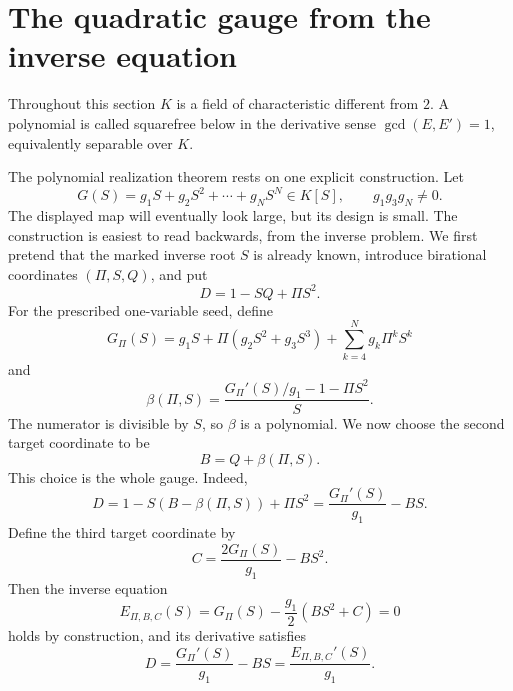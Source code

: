 \section{The quadratic gauge from the inverse equation}\label{sec:gauge}

Throughout this section \(K\) is a field of characteristic different from
\(2\).  A polynomial is called squarefree below in the derivative sense
\(\gcd(E,E')=1\), equivalently separable over \(K\).

The polynomial realization theorem rests on one explicit construction.
Let
\begin{equation}
 G(S)=g_1S+g_2S^2+\cdots+g_NS^N\in K[S],
 \qquad g_1g_3g_N\neq0.
 \label{eq:seed}
\end{equation}
The displayed map will eventually look large, but its design is small.  The
construction is easiest to read backwards, from the inverse problem.  We
first pretend that the marked inverse root \(S\) is already known, introduce
birational coordinates \((\Pi,S,Q)\), and put
\begin{equation}
 D=1-SQ+\Pi S^2.
 \label{eq:D-compact}
\end{equation}
For the prescribed one-variable seed, define
\begin{equation}
 G_\Pi(S)=g_1S+\Pi(g_2S^2+g_3S^3)
          +\sum_{k=4}^Ng_k\Pi^kS^k
 \label{eq:Gpi}
\end{equation}
and
\begin{equation}
 \beta(\Pi,S)
 =\frac{G_\Pi'(S)/g_1-1-\Pi S^2}{S}.
 \label{eq:beta}
\end{equation}
The numerator is divisible by \(S\), so \(\beta\) is a polynomial.  We now
choose the second target coordinate to be
\begin{equation}
 B=Q+\beta(\Pi,S).
 \label{eq:B-compact}
\end{equation}
This choice is the whole gauge.  Indeed,
\[
 D
 =1-S(B-\beta(\Pi,S))+\Pi S^2
 =\frac{G_\Pi'(S)}{g_1}-BS.
\]
Define the third target coordinate by
\begin{equation}
 C=\frac{2G_\Pi(S)}{g_1}-BS^2.
 \label{eq:C-compact}
\end{equation}
Then the inverse equation
\begin{equation}
 E_{\Pi,B,C}(S)
 =G_\Pi(S)-\frac{g_1}{2}(BS^2+C)=0
 \label{eq:inverse}
\end{equation}
holds by construction, and its derivative satisfies
\begin{equation}
 D=\frac{G_\Pi'(S)}{g_1}-BS
 =\frac{E_{\Pi,B,C}'(S)}{g_1}.
 \label{eq:D-derivative}
\end{equation}

